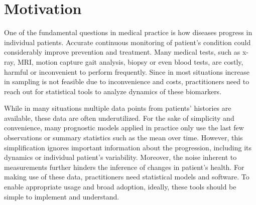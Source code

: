 \documentclass[preprint]{imsart}
\numberwithin{equation}{section}
\theoremstyle{plain}
\begin{document}
\begin{frontmatter}
\begin{abstract}
  
\end{abstract}

\begin{keyword}[class=MSC]
\end{keyword}

\begin{keyword}
\end{keyword}

\end{frontmatter}

\maketitle


\section{Motivation}

One of the fundamental questions in medical practice is how diseases progress in individual patients. Accurate continuous monitoring of patient's condition could considerably improve prevention and treatment. Many medical tests, such as x-ray, MRI, motion capture gait analysis, biopsy or even blood tests, are costly, harmful or inconvenient to perform frequently. Since in most situations increase in sampling is not feasible due to inconvenience and costs, practitioners need to reach out for statistical tools to analyze dynamics of these biomarkers.

While in many situations multiple data points from patients' histories are available, these data are often underutilized. For the sake of simplicity and convenience, many prognostic models applied in practice only use the last few observations or summary statistics such as the mean over time. However, this simplification ignores important information about the progression, including its dynamics or individual patient's variability. Moreover, the noise inherent to measurements further hinders the inference of changes in patient's health. For making use of these data, practitioners need statistical models and software. To enable appropriate usage and broad adoption, ideally, these tools should be simple to implement and understand.
\end{document}
